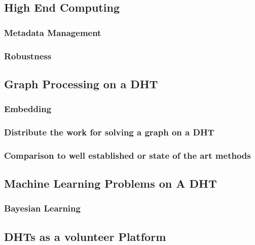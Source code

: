 \documentclass[10pt,letterpaper]{article}
\begin{document}
\subsection{High End Computing}
\subsubsection{Metadata Management}
\subsubsection{Robustness}

\subsection{Graph Processing on a DHT}
\subsubsection{Embedding}
\subsubsection{Distribute the work for solving a graph on a DHT}
\subsubsection{Comparison to well established or state of the art methods}

\subsection{Machine Learning Problems on A DHT}
\subsubsection{Bayesian Learning}

\subsection{DHTs as a volunteer Platform}
\end{document}
